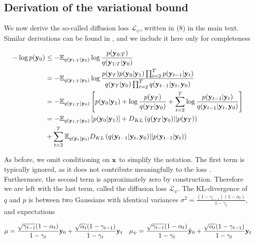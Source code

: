 \documentclass{article}
\begin{document}
\subsection{Derivation of the variational bound}

We now derive the so-called diffusion loss $\mathcal{L}_{\psi}$, written in (8) in the main text. Similar derivations can be found in \citep{Kingma2021,Ribeiro2024}, and we include it here only for completeness

\begin{align*}
-\log p(\bold{y}_{0}) &\leq - \mathbb{E}_{q(\bold{y}_{1:T}|\bold{y}_{0})} \log \frac{p(\bold{y}_{0:T})}{q(\bold{y}_{1:T}|\bold{y}_{0})}\\
&= -\mathbb{E}_{q(\bold{y}_{1:T}|\bold{y}_{0})} \log \frac{p(\bold{y}_{T})p(\bold{y}_0|\bold{y}_1) \prod_{t=2}^{T}p(\bold{y}_{t-1}|\bold{y}_t)}{q(\bold{y}_T|\bold{y}_0)\prod_{t=2}^{T}q(\bold{y}_{t-1}|\bold{y}_t,\bold{y}_0)}\\
&= -\mathbb{E}_{q(\bold{y}_{1:T}|\bold{y}_{0})} \left[ p(\bold{y}_0|\bold{y}_1) + \log \frac{p(\bold{y}_{T})}{q(\bold{y}_T|\bold{y}_0)} + \sum_{t=2}^{T} \log \frac{p(\bold{y}_{t-1}|\bold{y}_t)}{q(\bold{y}_{t-1}|\bold{y}_t,\bold{y}_0)}\right]\\
&= -\mathbb{E}_{q(\bold{y}_{1:T}|\bold{y}_{0})} \left[ p(\bold{y}_0|\bold{y}_1)\right] + D_{KL}\left(q(\bold{y}_T|\bold{y}_0) \lvert\lvert p(\bold{y}_{T})\right) \\
&+ \sum_{t=2}^{T} \mathbb{E}_{q(\bold{y}_{t}|\bold{y}_{0})} D_{KL}\left(q(\bold{y}_{t-1}|\bold{y}_t,\bold{y}_0)\lvert\lvert p(\bold{y}_{t-1}|\bold{y}_t) \right)
\end{align*}

As before, we omit conditioning on $\bold{x}$ to simplify the notation. The first term is typically ignored, as it does not contribute meaningfully to the loss \citep{Ribeiro2024}. Furthermore, the second term is approximately zero by construction. Therefore we are left with the last term, called the diffusion loss $\mathcal{L}_{\psi}$. The KL-divergence of $q$ and $p$ is between two Gaussians with identical variances $\sigma^{2} = \frac{(1-\gamma_{t-1})(1-\alpha_{t})}{1-\gamma_{t}}$, and expectations

\begin{align*}
\mu = \frac{\sqrt{\gamma_{t-1}}(1-\alpha_{t})}{1-\gamma_{t}}\bold{y}_{0}+ \frac{\sqrt{\alpha_{t}}(1-\gamma_{t-1})}{{1-\gamma_{t}}}\bold{y}_{t} \quad \mu_{\psi} = \frac{\sqrt{\gamma_{t-1}}(1-\alpha_{t})}{1-\gamma_{t}}\hat{\bold{y}}_{0}+ \frac{\sqrt{\alpha_{t}}(1-\gamma_{t-1})}{{1-\gamma_{t}}}\bold{y}_{t}
\end{align*}
\end{document}
